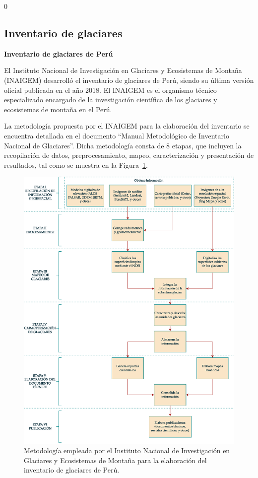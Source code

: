 0\subsection{Inventario de glaciares}

\textbf{Inventario de glaciares de Perú}

El Instituto Nacional de Investigación en Glaciares y Ecosistemas de Montaña (INAIGEM) desarrolló el inventario de glaciares de Perú, siendo su última versión oficial publicada en el año 2018. El INAIGEM es el organismo técnico especializado encargado de la investigación científica de los glaciares y ecosistemas de montaña en el Perú.

La metodología propuesta por el INAIGEM para la elaboración del inventario se encuentra detallada en el documento ``Manual Metodológico de Inventario Nacional de Glaciares''. Dicha metodología consta de 8 etapas, que incluyen la recopilación de datos, preprocesamiento, mapeo, caracterización y presentación de resultados, tal como se muestra en la Figura~\ref{fig:MetodologiaInaigem}.

\begin{figure}[H]
    \begin{center}
    \includegraphics[width=1\textwidth]{Images/MetodologiaInaigem.pdf}
    \end{center}
    \caption{Metodología empleada por el Instituto Nacional de Investigación en Glaciares y Ecosistemas de Montaña para la elaboración del inventario de glaciares de Perú.}
     \label{fig:MetodologiaInaigem}
\end{figure}

